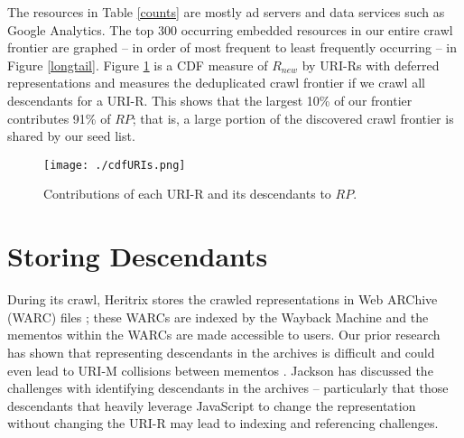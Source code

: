 \documentclass{sig-alternate}
\begin{document}



The resources in Table \ref{counts} are mostly ad servers and data services such as Google Analytics. The top 300 occurring embedded resources in our entire crawl frontier are graphed -- in order of most frequent to least frequently occurring -- in Figure \ref{longtail}. Figure \ref{cdf} is a CDF measure of $R_{new}$ by URI-Rs with deferred representations and measures the deduplicated crawl frontier if we crawl all descendants for a URI-R. This shows that the largest 10\% of our frontier contributes 91\% of $RP$; that is, a large portion of the discovered crawl frontier is shared by our seed list.


\begin{figure}
\centering
\texttt{[image: ./cdfURIs.png]}
\caption{Contributions of each URI-R and its descendants to $RP$.}
\label{cdf}
\end{figure}



\section{Storing Descendants}
During its crawl, Heritrix stores the crawled representations
in Web ARChive (WARC) files \cite{warciso}; these WARCs are
indexed by the Wayback Machine and the mementos within
the WARCs are made accessible to users. Our prior research
has shown that representing descendants in the archives is
difficult and could even lead to URI-M collisions between
mementos \cite{idReps}. Jackson has discussed \cite{jacksonSopa} the challenges
with identifying descendants in the archives -- particularly
that those descendants that heavily leverage JavaScript to
change the representation without changing the URI-R may
lead to indexing and referencing challenges.
\end{document}
